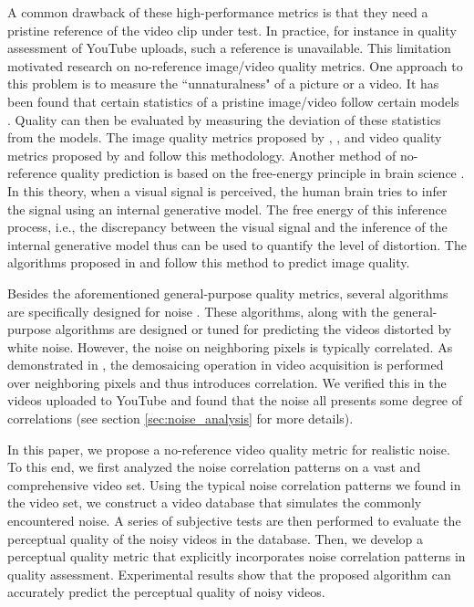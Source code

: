 \documentclass{sig-alternate}
\begin{document}
A common drawback of these high-performance metrics is that they need a pristine reference of the video clip under test. In practice, for instance in quality assessment of YouTube uploads, such a reference is unavailable. This limitation motivated research on no-reference image/video quality metrics. One approach to this problem is to measure the ``unnaturalness" of a picture or a video. It has been found that certain statistics of a pristine image/video follow certain models\cite{SriLeeSimZhu2003} \cite{ZorWei2009}. Quality can then be evaluated by measuring the deviation of these statistics from the models. The image quality metrics proposed by \cite{NIQE}, \cite{DIIVINE}, \cite{HNR} and video quality metrics proposed by \cite{BLIINDS} and \cite{ZhuLiAsaSau2015} follow this methodology. Another method of no-reference quality prediction is based on the free-energy principle in brain science \cite{Fri2010}. In this theory, when a visual signal is perceived, the human brain tries to infer the signal using an internal generative model. The free energy of this inference process, i.e., the discrepancy between the visual signal and the inference of the internal generative model thus can be used to quantify the level of distortion. The algorithms proposed in \cite{LiuZhaZhaSunGuYan2014} and \cite{ZhaWuYanLinZha2012} follow this method to predict image quality.

Besides the aforementioned general-purpose quality metrics, several algorithms are specifically designed for noise \cite{LimPar2014,ZhaKauWanYan2013,ZhaWu2011}. These algorithms, along with the general-purpose algorithms are designed or tuned for predicting the videos distorted by white noise. However, the noise on neighboring pixels is typically correlated. As demonstrated in \cite{SeyKeiKnoSte2013}, the demosaicing operation in video acquisition is performed over neighboring pixels and thus introduces correlation. We verified this in the videos uploaded to YouTube and found that the noise all presents some degree of correlations (see section \ref{sec:noise_analysis} for more details).

In this paper, we propose a no-reference video quality metric for realistic noise. To this end, we first analyzed the noise correlation patterns on a vast and comprehensive video set. Using the typical noise correlation patterns we found in the video set, we construct a video database that simulates the commonly encountered noise. A series of subjective tests are then performed to evaluate the perceptual quality of the noisy videos in the database. Then, we develop a perceptual quality metric that explicitly incorporates noise correlation patterns in quality assessment. Experimental results show that the proposed algorithm can accurately predict the perceptual quality of noisy videos. 
\end{document}

